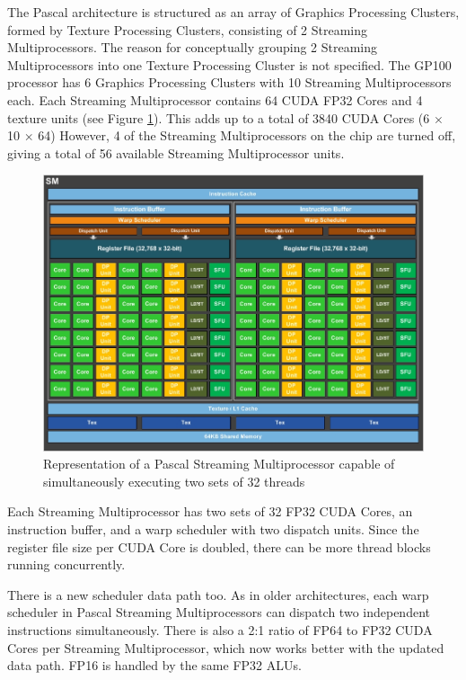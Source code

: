 The Pascal architecture is structured as an array of Graphics Processing Clusters, formed by Texture Processing Clusters, consisting of 2 Streaming Multiprocessors.
The reason for conceptually grouping 2 Streaming Multiprocessors into one Texture Processing Cluster is not specified.
The GP100 processor has 6 Graphics Processing Clusters with 10 Streaming Multiprocessors each.
Each Streaming Multiprocessor contains 64 CUDA FP32 Cores and 4 texture units (see Figure \ref{fig:sm}).
This adds up to a total of 3840 CUDA Cores (6 $\times$ 10 $\times$ 64)
However, 4 of the Streaming Multiprocessors on the chip are turned off, giving a total of 56 available Streaming Multiprocessor units.

\begin{figure}[ht!]
    \centering
    \includegraphics[width=\linewidth]{gp100_sm}
    \caption{Representation of a Pascal Streaming Multiprocessor capable of simultaneously executing two sets of 32 threads}
    \label{fig:sm}
\end{figure}

Each Streaming Multiprocessor has two sets of 32 FP32 CUDA Cores, an instruction buffer, and a warp scheduler with two dispatch units.
Since the register file size per CUDA Core is doubled, there can be more thread blocks running concurrently.

There is a new scheduler data path too.
As in older architectures, each warp scheduler in Pascal Streaming Multiprocessors can dispatch two independent instructions simultaneously.
There is also a 2:1 ratio of FP64 to FP32 CUDA Cores per Streaming Multiprocessor, which now works better with the updated data path.
FP16 is handled by the same FP32 ALUs.

